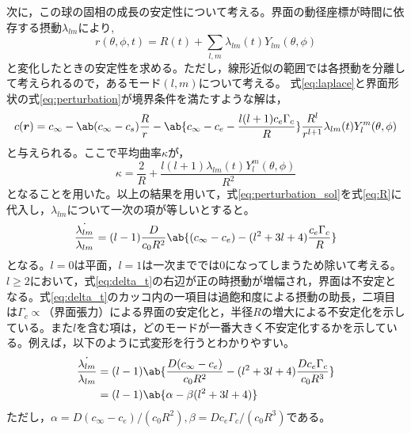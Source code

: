 \documentclass[autodetect-engine,dvi=dvipdfmx,a4paper,ja=standard,oneside,openany,11pt,draft]{bxjsbook}
\begin{document}
次に，この球の固相の成長の安定性について考える。界面の動径座標が時間に依存する摂動$\lambda_{lm}$により,
\begin{equation}
  r(\theta,\phi,t) = R(t) + \sum_{l,m} \lambda_{lm}(t)Y_{lm}(\theta,\phi)
  \label{eq:perturbation}
\end{equation}
と変化したときの安定性を求める。ただし，線形近似の範囲では各摂動を分離して考えられるので，あるモード$(l,m)$について考える。
式\eqref{eq:laplace}と界面形状の式\eqref{eq:perturbation}が境界条件を満たすような解は，
\begin{equation}
  \begin{split}
    c(\bm{r})=c_{\infty}-\ab(c_{\infty}-c_s)\frac{R}{r}-\ab\{c_\infty-c_e-\frac{l(l+1)c_e\Gamma_c}{R}\}\frac{R^l}{r^{l+1}}\lambda_{lm}(t)Y_{l}^{m}(\theta,\phi)
  \end{split}
  \label{eq:perturbation_sol}
\end{equation}
と与えられる。ここで平均曲率$\kappa$が，
\begin{equation}
  \kappa = \frac{2}{R}+\frac{l(l+1)\lambda_{lm}(t)Y_l^m(\theta,\phi)}{R^2}
  \label{eq:perturbation_curvature}
\end{equation}
となることを用いた。以上の結果を用いて，式\eqref{eq:perturbation_sol}を式\eqref{eq:R}に代入し，$\lambda_{lm}$について一次の項が等しいとすると。
\begin{equation}
  \frac{\dot{\lambda_{lm}}}{\lambda_{lm}} =(l-1)\frac{D}{c_0R^2}\ab\{(c_\infty-c_e)-(l^2+3l+4)\frac{c_e\Gamma_c}{R}\}
  \label{eq:delta_t}
\end{equation}
となる。$l=0$は平面，$l=1$は一次まででは0になってしまうため除いて考える。$l\geq2$において，式\eqref{eq:delta_t}の右辺が正の時摂動が増幅され，界面は不安定となる。式\eqref{eq:delta_t}のカッコ内の一項目は過飽和度による摂動の助長，二項目は$\Gamma_c\propto$（界面張力）による界面の安定化と，半径$R$の増大による不安定化を示している。また$l$を含む項は，どのモードが一番大きく不安定化するかを示している。例えば，以下のように式変形を行うとわかりやすい。
\begin{equation}
  \begin{split}
    \frac{\dot{\lambda_{lm}}}{\lambda_{lm}} & =(l-1)\ab\{\frac{D(c_\infty-c_e)}{c_0R^2}-(l^2+3l+4)\frac{D c_e\Gamma_c}{c_0 R^3}\} \\
                                            & =(l-1)\ab\{\alpha-\beta(l^2+3l+4)\}
  \end{split}
  \label{eq:delta_t_simple}
\end{equation}
ただし，$\alpha=D(c_\infty-c_e)/(c_0R^2),\beta=D c_e\Gamma_c/(c_0 R^3)$である。
\end{document}
